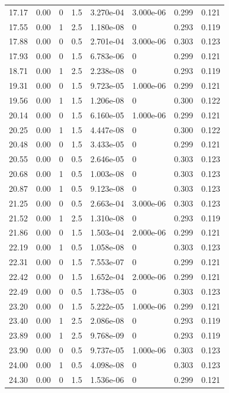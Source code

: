 \documentclass[preview]{standalone}
\begin{document}
{{{\begin{tabular}{L{1.2cm}C{1.2cm} C{0.3cm}C{0.5cm} C{1.4cm}C{1.4cm} C{1.4cm}C{1.4cm}}
  17.17  &  0.00  & 0     & 1.5 &  3.270e-04  & 3.000e-06  & 0.299 &  0.121   \\ 
  17.55  &  0.00  & 1     & 2.5 &  1.180e-08  & 0  & 0.293 &  0.119   \\ 
  17.88  &  0.00  & 0     & 0.5 &  2.701e-04  & 3.000e-06  & 0.303 &  0.123   \\ 
  17.93  &  0.00  & 0     & 1.5 &  6.783e-06  & 0  & 0.299 &  0.121   \\ 
  18.71  &  0.00  & 1     & 2.5 &  2.238e-08  & 0  & 0.293 &  0.119   \\ 
  19.31  &  0.00  & 0     & 1.5 &  9.723e-05  & 1.000e-06  & 0.299 &  0.121   \\ 
  19.56  &  0.00  & 1     & 1.5 &  1.206e-08  & 0  & 0.300 &  0.122   \\ 
  20.14  &  0.00  & 0     & 1.5 &  6.160e-05  & 1.000e-06  & 0.299 &  0.121   \\ 
  20.25  &  0.00  & 1     & 1.5 &  4.447e-08  & 0  & 0.300 &  0.122   \\ 
  20.48  &  0.00  & 0     & 1.5 &  3.433e-05  & 0  & 0.299 &  0.121   \\ 
  20.55  &  0.00  & 0     & 0.5 &  2.646e-05  & 0  & 0.303 &  0.123   \\ 
  20.68  &  0.00  & 1     & 0.5 &  1.003e-08  & 0  & 0.303 &  0.123   \\ 
  20.87  &  0.00  & 1     & 0.5 &  9.123e-08  & 0  & 0.303 &  0.123   \\ 
  21.25  &  0.00  & 0     & 0.5 &  2.663e-04  & 3.000e-06  & 0.303 &  0.123   \\ 
  21.52  &  0.00  & 1     & 2.5 &  1.310e-08  & 0  & 0.293 &  0.119   \\ 
  21.86  &  0.00  & 0     & 1.5 &  1.503e-04  & 2.000e-06  & 0.299 &  0.121   \\ 
  22.19  &  0.00  & 1     & 0.5 &  1.058e-08  & 0  & 0.303 &  0.123   \\ 
  22.31  &  0.00  & 0     & 1.5 &  7.553e-07  & 0  & 0.299 &  0.121   \\ 
  22.42  &  0.00  & 0     & 1.5 &  1.652e-04  & 2.000e-06  & 0.299 &  0.121   \\ 
  22.49  &  0.00  & 0     & 0.5 &  1.738e-05  & 0  & 0.303 &  0.123   \\ 
  23.20  &  0.00  & 0     & 1.5 &  5.222e-05  & 1.000e-06  & 0.299 &  0.121   \\ 
  23.40  &  0.00  & 1     & 2.5 &  2.086e-08  & 0  & 0.293 &  0.119   \\ 
  23.89  &  0.00  & 1     & 2.5 &  9.768e-09  & 0  & 0.293 &  0.119   \\ 
  23.90  &  0.00  & 0     & 0.5 &  9.737e-05  & 1.000e-06  & 0.303 &  0.123   \\ 
  24.00  &  0.00  & 1     & 0.5 &  4.098e-08  & 0  & 0.303 &  0.123   \\ 
  24.30  &  0.00  & 0     & 1.5 &  1.536e-06  & 0  & 0.299 &  0.121   \\ 
\hline 
\end{tabular} 

}}}
\end{document}
